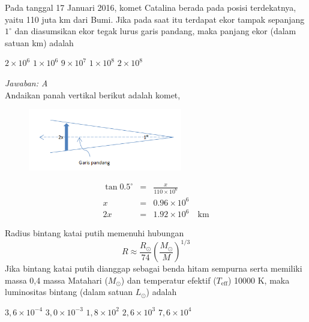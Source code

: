\documentclass[11pt,fleqn, a4paper]{exam}
\begin{document}
\begin{questions}
\vspace{0.5cm}
\question Pada tanggal 17 Januari 2016, komet Catalina berada pada posisi terdekatnya, yaitu 110 juta km dari Bumi. Jika pada saat itu terdapat ekor tampak sepanjang $1^{\circ}$ dan diasumsikan ekor tegak lurus garis pandang, maka panjang ekor (dalam satuan km) adalah
\begin{choices}
\choice $2 \times 10^6$
\choice $1 \times 10^6$
\choice $9 \times 10^7$
\choice $1 \times 10^8$
\choice $2 \times 10^8$
\end{choices}

\textit{Jawaban: A}\\
Andaikan panah vertikal berikut adalah komet,
\begin{figure}[H]
\centering
\includegraphics[width=0.6\textwidth]{gambar/2.png}
\end{figure}
\begin{eqnarray*}
\tan{0.5^{\circ}} &=& \frac{x}{110 \times 10^6}\\
x &=& 0.96 \times 10^6\\
2x &=& 1.92 \times 10^6 \quad \text{km}
\end{eqnarray*}


\vspace{0.5cm}
\question Radius bintang katai putih memenuhi hubungan
\begin{equation*}
R \approx \frac{R_{\odot}}{74} \left( \frac{M_{\odot}}{M} \right)^{1/3}
\end{equation*}
Jika bintang katai putih dianggap sebagai benda hitam sempurna serta memiliki massa 0,4 massa Matahari ($M_{\odot}$) dan temperatur efektif ($T_{\text{eff}}$) 10000 K, maka luminositas bintang (dalam satuan $L_{\odot}$) adalah
\begin{choices}
\choice $3,6 \times 10^{-4}$
\choice $3,0 \times 10^{-3}$
\choice $1,8 \times 10^{2}$
\choice $2,6 \times 10^{3}$
\choice $7,6 \times 10^{4}$
\end{choices}


\end{questions}
\end{document}
